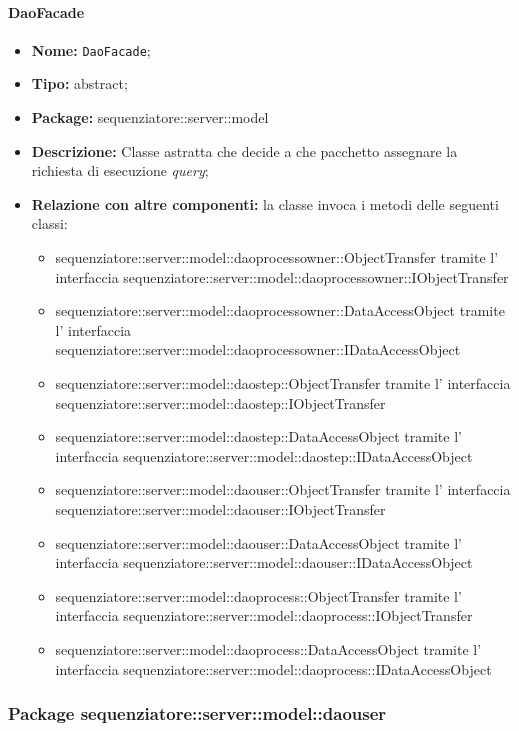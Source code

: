 \paragraph{DaoFacade}
	\begin{itemize}
		\item \textbf{Nome:} \texttt{DaoFacade};
		\item \textbf{Tipo:} abstract;
		\item \textbf{Package:} sequenziatore::server::model
		\item \textbf{Descrizione:} Classe astratta che decide a che pacchetto assegnare la richiesta di esecuzione \textit{query};
		\item \textbf{Relazione con altre componenti:} la classe invoca i metodi delle seguenti classi:
		\begin{itemize}
			\item sequenziatore::server::model::daoprocessowner::ObjectTransfer tramite l' interfaccia sequenziatore::server::model::daoprocessowner::IObjectTransfer
			\item sequenziatore::server::model::daoprocessowner::DataAccessObject tramite l' interfaccia sequenziatore::server::model::daoprocessowner::IDataAccessObject
			\item sequenziatore::server::model::daostep::ObjectTransfer tramite l' interfaccia sequenziatore::server::model::daostep::IObjectTransfer
			\item sequenziatore::server::model::daostep::DataAccessObject tramite l' interfaccia sequenziatore::server::model::daostep::IDataAccessObject
			\item sequenziatore::server::model::daouser::ObjectTransfer tramite l' interfaccia sequenziatore::server::model::daouser::IObjectTransfer
			\item sequenziatore::server::model::daouser::DataAccessObject tramite l' interfaccia sequenziatore::server::model::daouser::IDataAccessObject
			\item sequenziatore::server::model::daoprocess::ObjectTransfer tramite l' interfaccia sequenziatore::server::model::daoprocess::IObjectTransfer
			\item sequenziatore::server::model::daoprocess::DataAccessObject tramite l' interfaccia sequenziatore::server::model::daoprocess::IDataAccessObject
		\end{itemize}
	\end{itemize}
\subsubsection{Package sequenziatore::server::model::daouser}
